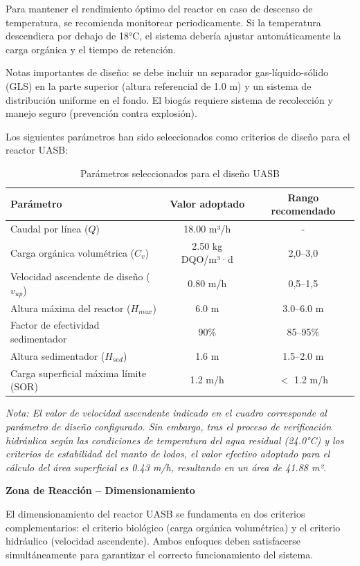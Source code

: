 \documentclass[12pt,a4paper]{article}
\begin{document}
Para mantener el rendimiento óptimo del reactor en caso de descenso de temperatura, se recomienda monitorear periodicamente. Si la temperatura descendiera por debajo de 18°C, el sistema debería ajustar automáticamente la carga orgánica y el tiempo de retención.

Notas importantes de diseño: se debe incluir un separador gas-líquido-sólido (GLS) en la parte superior (altura referencial de 1.0 m) y un sistema de distribución uniforme en el fondo. El biogás requiere sistema de recolección y manejo seguro (prevención contra explosión).

Los siguientes parámetros han sido seleccionados como criterios de diseño para el reactor UASB:

\begin{table}[H]
\centering
\caption{Parámetros seleccionados para el diseño UASB}
\begin{tabular}{p{6cm}cc}
\toprule
\textbf{Parámetro} & \textbf{Valor adoptado} & \textbf{Rango recomendado} \\
\midrule
Caudal por línea ($Q$) & 18.00 m³/h & - \\
Carga orgánica volumétrica ($C_v$) & 2.50 kg DQO/m³·d & 2,0--3,0 \\
Velocidad ascendente de diseño ($v_{up}$) & 0.80 m/h & 0,5--1,5 \\
Altura máxima del reactor ($H_{max}$) & 6.0 m & 3.0--6.0 m \\
Factor de efectividad sedimentador & 90\% & 85--95\% \\
Altura sedimentador ($H_{sed}$) & 1.6 m & 1.5--2.0 m \\
Carga superficial máxima límite (SOR) & 1.2 m/h & $<$ 1.2 m/h \\
\bottomrule
\end{tabular}
\end{table}

\textit{Nota: El valor de velocidad ascendente indicado en el cuadro corresponde al parámetro de diseño configurado. Sin embargo, tras el proceso de verificación hidráulica según las condiciones de temperatura del agua residual (24.0°C) y los criterios de estabilidad del manto de lodos, el valor efectivo adoptado para el cálculo del área superficial es 0.43 m/h, resultando en un área de 41.88 m².}

\textbf{Zona de Reacción -- Dimensionamiento}

El dimensionamiento del reactor UASB se fundamenta en dos criterios complementarios: el criterio biológico (carga orgánica volumétrica) y el criterio hidráulico (velocidad ascendente). Ambos enfoques deben satisfacerse simultáneamente para garantizar el correcto funcionamiento del sistema.
\end{document}
